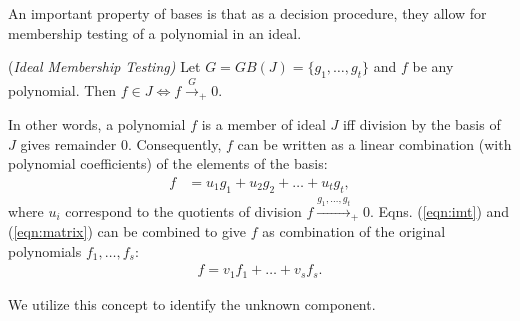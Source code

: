 An important property of \Grobner bases is that as a decision
procedure, they allow for membership testing of a polynomial in an
ideal. 

\begin{Lemma}
\label{lem:imt}
({\it Ideal Membership Testing)
} 
Let $G = GB(J) = \{g_1,\dots,g_t\}$ and $f$ be any polynomial. Then
$f\in J \iff f\xrightarrow{G}_+0$.
\end{Lemma}

In other words, a polynomial $f$ is a member of ideal $J$ iff division
by the \Grobner basis of $J$ gives remainder 0. Consequently, $f$ can
be written as a linear combination (with polynomial coefficients) of
the elements of the \Grobner basis: 
\begin{align}\label{eqn:imt}
f & = u_1g_1 + u_2g_2+ \dots+ u_tg_t,
\end{align}
where $u_i$ correspond to the quotients of division
$f\xrightarrow{g_1,\dots,g_t}_+0$. Eqns. (\ref{eqn:imt}) and
(\ref{eqn:matrix}) can be combined to give $f$ as combination of the
original polynomials $f_1,\dots,f_s$:
\begin{align}\label{eqn:imt_orig}
f = v_1f_1 +\dots+v_sf_s.
\end{align}

We utilize this concept to identify the unknown component. 


